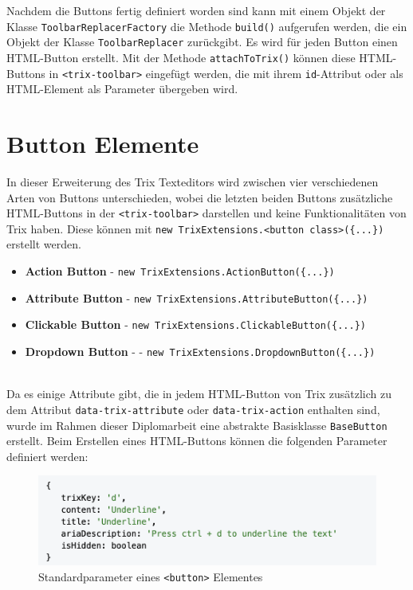 Nachdem die Buttons fertig definiert worden sind kann mit einem Objekt der Klasse \texttt{ToolbarReplacerFactory} 
die Methode \texttt{build()} aufgerufen werden, die ein Objekt der Klasse \texttt{ToolbarReplacer} zurückgibt. Es wird  
für jeden Button einen HTML-Button erstellt. Mit der Methode \texttt{attachToTrix()} können diese HTML-Buttons in  
\texttt{<trix-toolbar>} eingefügt werden, die mit ihrem \texttt{id}-Attribut oder als HTML-Element als Parameter 
übergeben wird.

\section{Button Elemente}
\label{subsec:buttons}
In dieser Erweiterung des Trix Texteditors wird zwischen vier verschiedenen Arten von Buttons unterschieden, wobei 
die  letzten beiden Buttons zusätzliche HTML-Buttons in der \texttt{<trix-toolbar>} darstellen und keine 
Funktionalitäten 
von Trix haben. Diese können mit \texttt{new TrixExtensions.<button class>(\{...\})} erstellt werden.

\begin{itemize}
	\item{\textbf{Action Button}} - \texttt{new TrixExtensions.ActionButton(\{...\})}
	\item{\textbf{Attribute Button}} - \texttt{new TrixExtensions.AttributeButton(\{...\})}
	\item{\textbf{Clickable Button}} - \texttt{new TrixExtensions.ClickableButton(\{...\})}
	\item{\textbf{Dropdown Button}} - - \texttt{new TrixExtensions.DropdownButton(\{...\})}
\end{itemize}

\mbox{}\\
Da es einige Attribute gibt, die in jedem HTML-Button von Trix zusätzlich zu dem Attribut \texttt{data-trix-attribute} 
oder 
\texttt{data-trix-action} enthalten sind, wurde im Rahmen dieser Diplomarbeit eine abstrakte Basisklasse 
\texttt{BaseButton} 
erstellt. Beim Erstellen eines HTML-Buttons können die folgenden Parameter definiert werden:

\begin{figure}[H]
\begin{center}
	\includegraphics[scale=.7]{images/base-button.png}
\end{center}
	\caption{Standardparameter eines \texttt{<button>} Elementes}
\end{figure}

